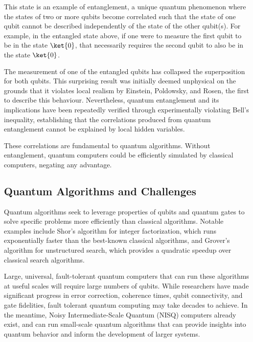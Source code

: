 This state is an example of entanglement, a unique quantum phenomenon where the states of two or more qubits become correlated such that the state of one qubit cannot be described independently of the state of the other qubit(s). For example, in the entangled state above, if one were to measure the first qubit to be in the state $\ket{0}$, that necessarily requires the second qubit to also be in the state $\ket{0}$. 

The measurement of one of the entangled qubits has collapsed the superposition for both qubits. This surprising result was initially deemed unphysical on the grounds that it violates local realism by Einstein, Poldowsky, and Rosen, the first to describe this behaviour\cite{epr_paradox}. Nevertheless, quantum entanglement and its implications have been repeatedly verified through experimentally violating Bell's inequality, establishing that the correlations produced from quantum entanglement cannot be explained by local hidden variables.

These correlations are fundamental to quantum algorithms. Without entanglement, quantum computers could be efficiently simulated by classical computers, negating any advantage.

\subsection{Quantum Algorithms and Challenges}

Quantum algorithms seek to leverage properties of qubits and quantum gates to solve specific problems more efficiently than classical algorithms. Notable examples include Shor's algorithm for integer factorization\cite{Shor_algorithm}, which runs exponentially faster than the best-known classical algorithms, and Grover's algorithm for unstructured search\cite{grover_search}, which provides a quadratic speedup over classical search algorithms.

Large, universal, fault-tolerant quantum computers that can run these algorithms at useful scales will require large numbers of qubits. While researchers have made significant progress in error correction, coherence times, qubit connectivity, and gate fidelities, fault tolerant quantum computing may take decades to achieve. In the meantime, Noisy Intermediate-Scale Quantum (NISQ) computers already exist, and can run small-scale quantum algorithms that can provide insights into quantum behavior and inform the development of larger systems.

